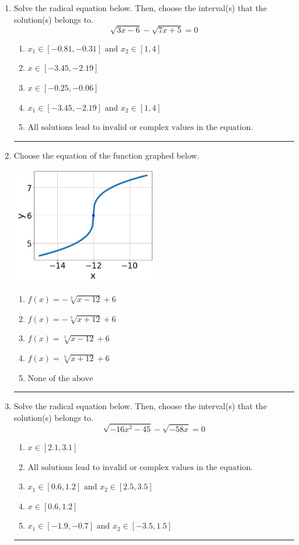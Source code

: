 \documentclass[14pt]{extbook}
\newcommand{\litem}[1]{\item#1\hspace*{-1cm}\rule{\textwidth}{0.4pt}}
\begin{document}
\begin{enumerate}
{\begin{enumerate}[label=\Alph*.]
\end{enumerate} }
\litem{
Solve the radical equation below. Then, choose the interval(s) that the solution(s) belongs to.\[ \sqrt{3 x - 6} - \sqrt{7 x + 5} = 0 \]\begin{enumerate}[label=\Alph*.]
\item \( x_1 \in [-0.81, -0.31] \text{ and } x_2 \in [1,4] \)
\item \( x \in [-3.45,-2.19] \)
\item \( x \in [-0.25,-0.06] \)
\item \( x_1 \in [-3.45, -2.19] \text{ and } x_2 \in [1,4] \)
\item \( \text{All solutions lead to invalid or complex values in the equation.} \)

\end{enumerate} }
\litem{
Choose the equation of the function graphed below.
\begin{center}
    \includegraphics[width=0.5\textwidth]{../Figures/radicalGraphToEquationCopyB.png}
\end{center}
\begin{enumerate}[label=\Alph*.]
\item \( f(x) = - \sqrt[3]{x - 12} + 6 \)
\item \( f(x) = - \sqrt[3]{x + 12} + 6 \)
\item \( f(x) = \sqrt[3]{x - 12} + 6 \)
\item \( f(x) = \sqrt[3]{x + 12} + 6 \)
\item \( \text{None of the above} \)

\end{enumerate} }
\litem{
Solve the radical equation below. Then, choose the interval(s) that the solution(s) belongs to.\[ \sqrt{-16 x^2 - 45} - \sqrt{-58 x} = 0 \]\begin{enumerate}[label=\Alph*.]
\item \( x \in [2.1,3.1] \)
\item \( \text{All solutions lead to invalid or complex values in the equation.} \)
\item \( x_1 \in [0.6, 1.2] \text{ and } x_2 \in [2.5,3.5] \)
\item \( x \in [0.6,1.2] \)
\item \( x_1 \in [-1.9, -0.7] \text{ and } x_2 \in [-3.5,1.5] \)


\end{enumerate}}
\end{enumerate}
\end{document}
